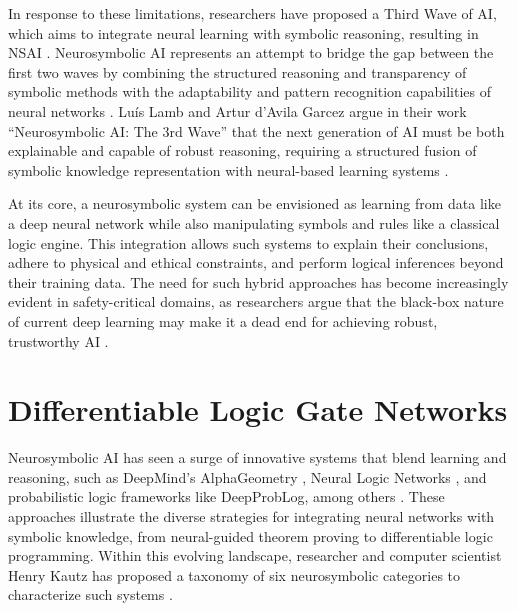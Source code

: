 In response to these limitations, researchers have proposed a Third Wave of AI, which aims to integrate neural learning with symbolic reasoning, resulting in NSAI \cite{garcez2023neurosymbolic, nsai_trends}. Neurosymbolic AI represents an attempt to bridge the gap between the first two waves by combining the structured reasoning and transparency of symbolic methods with the adaptability and pattern recognition capabilities of neural networks \cite{colelough2025neurosymbolicai2024systematic}. Luís Lamb and Artur d’Avila Garcez argue in their work ``Neurosymbolic AI: The 3rd Wave'' that the next generation of AI must be both explainable and capable of robust reasoning, requiring a structured fusion of symbolic knowledge representation with neural-based learning systems \cite{garcez2023neurosymbolic}. 

At its core, a neurosymbolic system can be envisioned as learning from data like a deep neural network while also manipulating symbols and rules like a classical logic engine. This integration allows such systems to explain their conclusions, adhere to physical and ethical constraints, and perform logical inferences beyond their training data. The need for such hybrid approaches has become increasingly evident in safety-critical domains, as researchers argue that the black-box nature of current deep learning may make it a dead end for achieving robust, trustworthy AI \cite{refId0, marcus2022deeparticle}.  


\section{Differentiable Logic Gate Networks}
\label{sec:sec_difflogic}

Neurosymbolic AI has seen a surge of innovative systems that blend learning and reasoning, such as DeepMind’s AlphaGeometry \cite{53097, chervonyi2025goldmedalistperformancesolvingolympiad}, Neural Logic Networks \cite{shi2019neurallogicnetworks}, and probabilistic logic frameworks like DeepProbLog, among others \cite{manhaeve2018deepproblogneuralprobabilisticlogic}. These approaches illustrate the diverse strategies for integrating neural networks with symbolic knowledge, from neural-guided theorem proving to differentiable logic programming. Within this evolving landscape, researcher and computer scientist Henry Kautz has proposed a taxonomy of six neurosymbolic categories to characterize such systems \cite{Kautz_2022}.

